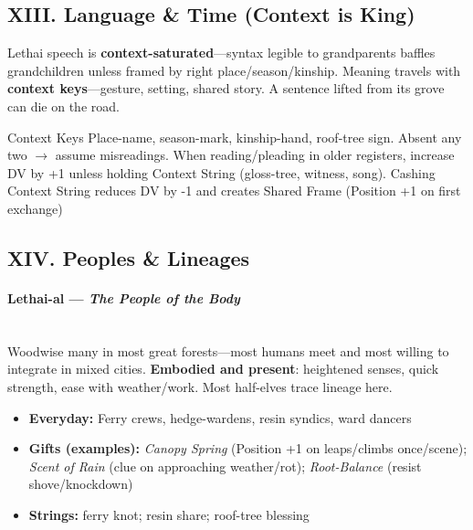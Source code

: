 \documentclass[11pt]{book}
\begin{document}
\subsection{XIII. Language \& Time (Context is King)}
Lethai speech is \textbf{context-saturated}---syntax legible to grandparents baffles grandchildren unless framed by right place/season/kinship. Meaning travels with \textbf{context keys}---gesture, setting, shared story. A sentence lifted from its grove can die on the road.
\begin{atTheTable}{Context Keys}
Place-name, season-mark, kinship-hand, roof-tree sign. Absent any two $\rightarrow$ assume misreadings. When reading/pleading in older registers, increase DV by +1 unless holding Context String (gloss-tree, witness, song). Cashing Context String reduces DV by -1 and creates Shared Frame (Position +1 on first exchange)
\end{atTheTable}

\subsection{XIV. Peoples \& Lineages}
\paragraph{Lethai-al --- \emph{The People of the Body}} \\
Woodwise many in most great forests---most humans meet and most willing to integrate in mixed cities. \textbf{Embodied and present}: heightened senses, quick strength, ease with weather/work. Most half-elves trace lineage here.
\begin{itemize}
    \item \textbf{Everyday:} Ferry crews, hedge-wardens, resin syndics, ward dancers
    \item \textbf{Gifts (examples):} \emph{Canopy Spring} (Position +1 on leaps/climbs once/scene); \emph{Scent of Rain} (clue on approaching weather/rot); \emph{Root-Balance} (resist shove/knockdown)
    \item \textbf{Strings:} ferry knot; resin share; roof-tree blessing
\end{itemize}
\end{document}
